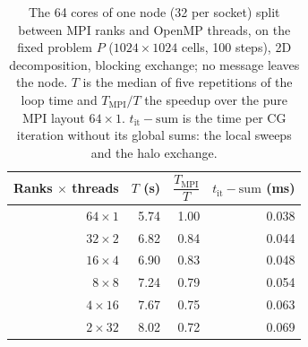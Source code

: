 \begin{table}[htbp]
\centering
\small
\begin{tabular}{rrrr}
\toprule
\shortstack[r]{Ranks $\times$\\threads} & \shortstack[r]{$T$\\(s)} & $\dfrac{T_{\mathrm{MPI}}}{T}$ & \shortstack[r]{$t_{\mathrm{it}}-\mathrm{sum}$\\(ms)} \\
\midrule
$64\times1$ & 5.74 & 1.00 & 0.038 \\
$32\times2$ & 6.82 & 0.84 & 0.044 \\
$16\times4$ & 6.90 & 0.83 & 0.048 \\
$8\times8$ & 7.24 & 0.79 & 0.054 \\
$4\times16$ & 7.67 & 0.75 & 0.063 \\
$2\times32$ & 8.02 & 0.72 & 0.069 \\
\bottomrule
\end{tabular}
\caption{The 64 cores of one node (32 per socket) split between MPI ranks and OpenMP threads, on the fixed problem $P$ ($1024\times1024$ cells, 100 steps), 2D decomposition, blocking exchange; no message leaves the node. $T$ is the median of five repetitions of the loop time and $T_{\mathrm{MPI}}/T$ the speedup over the pure MPI layout $64\times1$. $t_{\mathrm{it}}-\mathrm{sum}$ is the time per CG iteration without its global sums: the local sweeps and the halo exchange.}
\label{tab:hybrid-node}
\end{table}
